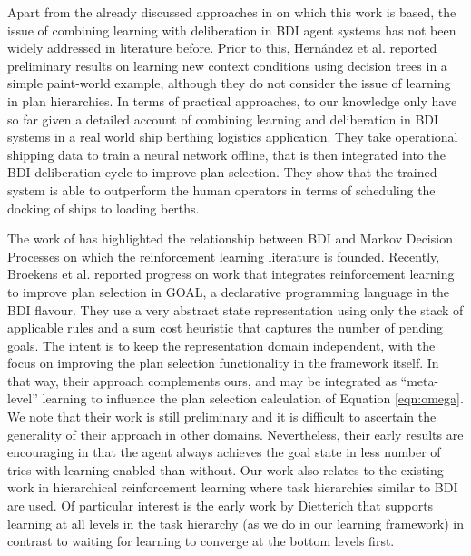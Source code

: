 Apart from the already discussed approaches in \cite{airiau09:enhancing,singh10:extending,singh10:learning} on which this work is based, the issue of combining learning with deliberation in BDI agent systems has not been widely addressed in literature before. 
%
Prior to this, Hern\'andez et al. \cite{hernandez04:learning} reported preliminary results on learning new context conditions using decision trees in a simple paint-world example, although they do not consider the issue of learning in plan hierarchies. In terms of practical approaches, to our knowledge only \cite{lokuge07:improving} have so far given a detailed account of combining learning and deliberation in BDI systems in a real world ship berthing logistics application. They take operational shipping data to train a neural network offline, that is then integrated into the BDI deliberation cycle to improve plan selection. They show that the trained system is able to outperform the human operators in terms of scheduling the docking of ships to loading berths.

The work of \cite{simari06:relationship} has highlighted the relationship between BDI and Markov Decision Processes on which the reinforcement learning literature is founded. 
%
Recently, Broekens et al. \cite{broekens10:reinforcement} reported progress on work that integrates reinforcement learning to improve plan selection in GOAL, a declarative programming language in the BDI flavour. They use a very abstract state representation using only the stack of applicable rules and a sum cost heuristic that captures the number of pending goals. The intent is to keep the representation domain independent, with the focus on improving the plan selection functionality in the framework itself. In that way, their approach complements ours, and may be integrated as ``meta-level'' learning to influence the plan selection calculation of Equation \ref{eqn:omega}. We note that their work is still preliminary and it is difficult to ascertain the generality of their approach in other domains. Nevertheless, their early results are encouraging in that the agent always achieves the goal state in less number of tries with learning enabled than without.
%
Our work also relates to the existing work in hierarchical reinforcement learning \cite{barto03:recent} where task hierarchies similar to BDI are used. Of particular interest is the early work by Dietterich \cite{dietterich00:hierarchical} that supports learning at all levels in the task hierarchy (as we do in our learning framework) in contrast to waiting for learning to converge at the bottom levels first.



